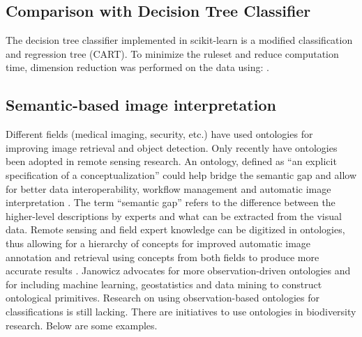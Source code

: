 \documentclass[a4paper,12pt]{article}
\begin{document}
\subsection{Comparison with Decision Tree Classifier}
The decision tree classifier implemented in scikit-learn is a modified
classification and regression tree (CART)\cite{scikit-learn}. To minimize the
ruleset and reduce computation time, dimension reduction was performed on the
data using: . 

\subsection{Semantic-based image interpretation}
Different fields (medical imaging, security, etc.) have used ontologies for
improving image retrieval and object detection. Only recently have ontologies
been adopted in remote sensing research. An ontology, defined as ``an explicit
specification of a conceptualization'' \cite{gruber1993} could help bridge the
semantic gap and allow for better data interoperability, workflow management and
automatic image interpretation \cite{Arvor2013} \cite{Andres2013a}. The term
``semantic gap'' refers to the difference between the higher-level descriptions
by experts and what can be extracted from the visual data. Remote sensing and
field expert knowledge can be digitized in ontologies, thus allowing for a
hierarchy of concepts for improved automatic image annotation and retrieval
using concepts from both fields to produce more accurate results
\cite{Srikanth:2005:EOA:1076034.1076128}. Janowicz \cite{Janowicz2012}
advocates for more observation-driven ontologies and for including machine
learning, geostatistics and data mining to construct ontological primitives.
Research on using observation-based ontologies for classifications is still
lacking. There are initiatives to use ontologies in biodiversity research. Below
are some examples.
\end{document}
